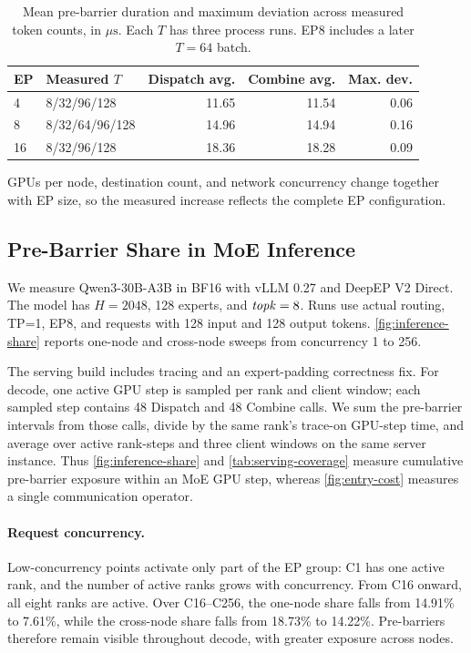 \begin{table}[t]
\centering
\small
\setlength{\tabcolsep}{3pt}
\begin{tabular}{@{}llrrr@{}}
\toprule
EP & Measured $T$ & Dispatch avg. & Combine avg. & Max. dev.\\
\midrule
4 & 8/32/96/128 & 11.65 & 11.54 & 0.06\\
8 & 8/32/64/96/128 & 14.96 & 14.94 & 0.16\\
16 & 8/32/96/128 & 18.36 & 18.28 & 0.09\\
\bottomrule
\end{tabular}
\caption{Mean pre-barrier duration and maximum deviation across measured token counts, in \(\mu\mathrm{s}\). Each $T$ has three process runs. EP8 includes a later $T=64$ batch.}
\label{tab:entry-constants}
\end{table}

GPUs per node, destination count, and network concurrency change together with EP size, so the measured increase reflects the complete EP configuration.

\subsection{Pre-Barrier Share in MoE Inference}
\label{sec:e2e}
We measure Qwen3-30B-A3B in BF16 with vLLM 0.27 and DeepEP V2 Direct. The model has $H=2048$, 128 experts, and $\mathit{topk}=8$. Runs use actual routing, TP=1, EP8, and requests with 128 input and 128 output tokens. \autoref{fig:inference-share} reports one-node and cross-node sweeps from concurrency 1 to 256.

The serving build includes tracing and an expert-padding correctness fix. For decode, one active GPU step is sampled per rank and client window; each sampled step contains 48 Dispatch and 48 Combine calls. We sum the pre-barrier intervals from those calls, divide by the same rank's trace-on GPU-step time, and average over active rank-steps and three client windows on the same server instance. Thus \autoref{fig:inference-share} and \autoref{tab:serving-coverage} measure cumulative pre-barrier exposure within an MoE GPU step, whereas \autoref{fig:entry-cost} measures a single communication operator.



\paragraph{Request concurrency.}
Low-concurrency points activate only part of the EP group: C1 has one active rank, and the number of active ranks grows with concurrency. From C16 onward, all eight ranks are active. Over C16--C256, the one-node share falls from 14.91\% to 7.61\%, while the cross-node share falls from 18.73\% to 14.22\%. Pre-barriers therefore remain visible throughout decode, with greater exposure across nodes.

